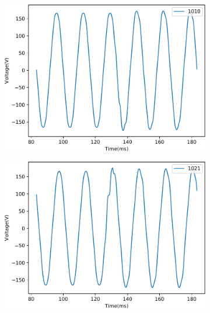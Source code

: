 \begin{figure}[!ht]
    \centering
    \begin{subfigure}{.45\textwidth}
        \centering
        \includegraphics[width=1\linewidth]{img/napali_eval/subthreshold/ev2/trans_1010.pdf}
    \end{subfigure}\hspace{5mm}
    \begin{subfigure}{.45\textwidth}
        \centering
        \includegraphics[width=1\linewidth]{img/napali_eval/subthreshold/ev2/trans_1021.pdf}
    \end{subfigure}
    \begin{subfigure}{.45\textwidth}
        \centering

\end{subfigure}
\end{figure}
